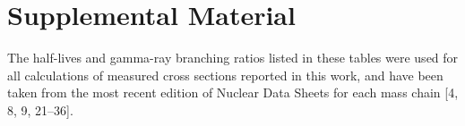 \documentclass[a4paper,10pt]{article}
\title{}
\author{}
\begin{document}

% 


\section{Supplemental Material} \label{fe_supp_material}
% 
The   half-lives and gamma-ray branching ratios  listed in these tables were used for all calculations of measured cross sections reported in this work, and have been taken from the most recent edition of  Nuclear Data Sheets for each  mass chain  [4, 8, 9, 21--36].
\end{document}
